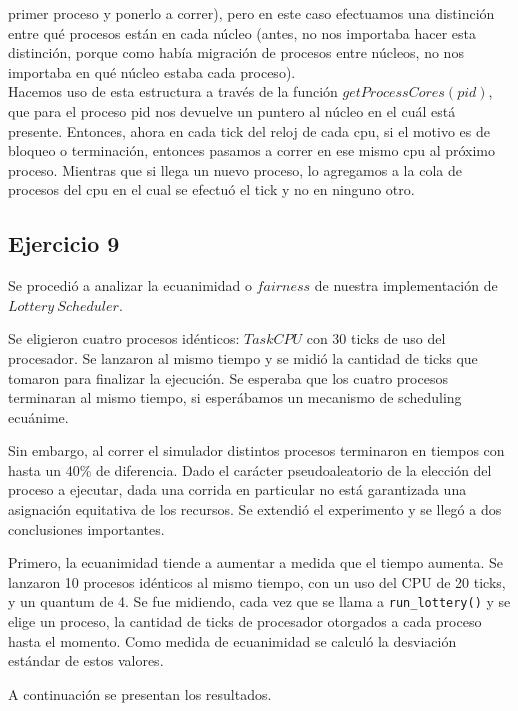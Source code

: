 \documentclass[a4paper]{article}
\begin{document}
primer proceso y ponerlo a correr), pero en este caso efectuamos una distinci\'on entre qu\'e procesos est\'an en cada
n\'ucleo (antes, no nos importaba hacer esta distinci\'on, porque como hab\'ia migraci\'on de procesos entre 
n\'ucleos, no nos importaba en qu\'e n\'ucleo estaba cada proceso). \\
Hacemos uso de esta estructura a trav\'es de la funci\'on $getProcessCores(pid)$, que para 
el proceso pid nos devuelve un puntero al n\'ucleo en el cu\'al est\'a presente. Entonces, ahora
en cada tick del reloj de cada cpu, si el motivo es de bloqueo o terminaci\'on, entonces pasamos a correr en ese mismo
cpu al pr\'oximo proceso. Mientras que si llega un nuevo proceso, lo agregamos a la cola de procesos del cpu
en el cual se efectu\'o el tick y no en ninguno otro. \\
\newpage
\subsection{Ejercicio 9}

Se procedió a analizar la ecuanimidad o $fairness$ de nuestra implementación de $Lottery\ Scheduler$.

Se eligieron cuatro procesos idénticos: $TaskCPU$ con 30 ticks de uso del procesador. Se lanzaron al mismo tiempo y se midió la cantidad de ticks que tomaron para finalizar la ejecución. Se esperaba que los cuatro procesos terminaran al mismo tiempo, si esperábamos un mecanismo de scheduling ecuánime.

Sin embargo, al correr el simulador distintos procesos terminaron en tiempos con hasta un 40\% de diferencia. Dado el carácter pseudoaleatorio de la elección del proceso a ejecutar, dada una corrida en particular no está garantizada una asignación equitativa de los recursos. Se extendió el experimento y se llegó a dos conclusiones importantes.

Primero, la ecuanimidad tiende a aumentar a medida que el tiempo aumenta. Se lanzaron 10 procesos idénticos al mismo tiempo, con un uso del CPU de 20 ticks, y un quantum de 4. Se fue midiendo, cada vez que se llama a \texttt{run\_lottery()} y se elige un proceso, la cantidad de ticks de procesador otorgados a cada proceso hasta el momento. Como medida de ecuanimidad se calculó la desviación estándar de estos valores.

A continuación se presentan los resultados.
\end{document}
